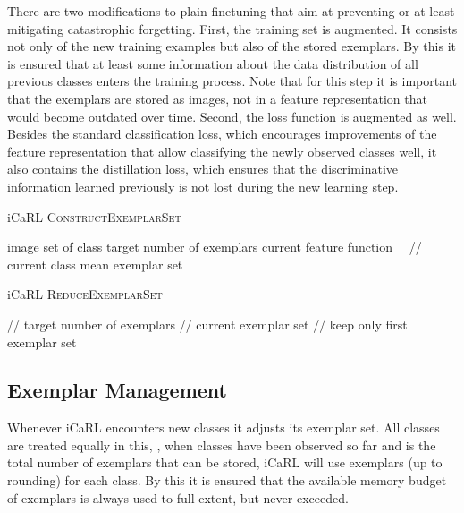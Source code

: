 \documentclass[10pt,twocolumn,letterpaper]{article}
\begin{document}
There are two modifications to plain finetuning that aim at
preventing or at least mitigating catastrophic forgetting.
First, the training set is augmented. It consists not only 
of the new training examples but also of the stored exemplars. 
By this it is ensured that at least some information about 
the data distribution of all previous classes enters the 
training process. 
Note that for this step it is important that the exemplars 
are stored as images, not in a feature representation that
would become outdated over time.
Second, the loss function is augmented as well.
Besides the standard classification loss, which encourages 
improvements of the feature representation that allow classifying 
the newly observed classes well, it also contains the distillation 
loss, which ensures that the discriminative information learned 
previously is not lost during the new learning step.

\begin{algorithm}[t]
\caption{iCaRL \textsc{ConstructExemplarSet}}\label{alg:newexemplars}
    \begin{algorithmic}
        \INPUT image set  of class 
        \INPUT  target number of exemplars
        \REQUIRE current feature function 
        \STATE  \ \  // current class mean
        \FOR{}
        \STATE 
        \ENDFOR
        \STATE 
        \OUTPUT exemplar set 
    \end{algorithmic}
\end{algorithm}

\begin{algorithm}[t]
\caption{iCaRL \textsc{ReduceExemplarSet}}\label{alg:removeexemplars}
    \begin{algorithmic}
        \INPUT  \qquad\qquad // target number of exemplars
        \INPUT  \qquad // current exemplar set
        \STATE         \qquad\qquad // \ie keep only first 
        \OUTPUT exemplar set 
    \end{algorithmic}
\end{algorithm}

\subsection{Exemplar Management}\label{subsec:exemplars}

Whenever iCaRL encounters new classes it adjusts its exemplar set. 
All classes are treated equally in this, \ie, when  classes have 
been observed so far and  is the total number of exemplars that
can be stored, iCaRL will use  exemplars (up to rounding) 
for each class. 
By this it is ensured that the available memory budget of  
exemplars is always used to full extent, but never exceeded. 
\end{document}

